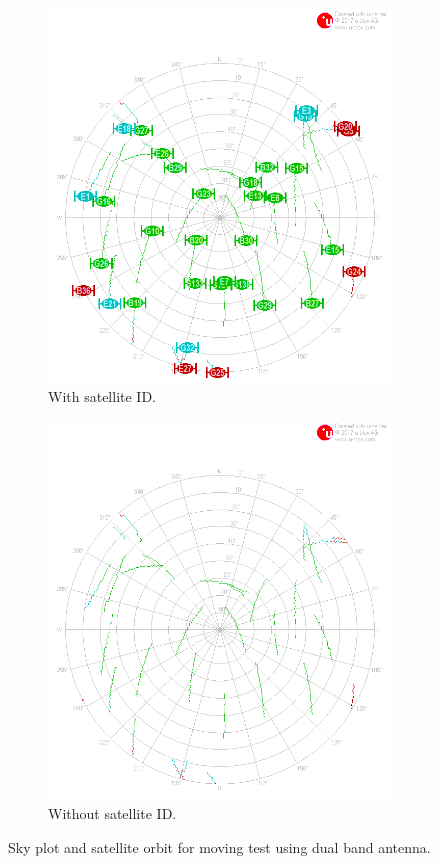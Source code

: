 \documentclass[letterpaper, 10 pt,onecolumn]{article}
\begin{document}
	\begin{figure}[H]
		\centering
		\begin{subfigure}{.5\textwidth}
			\includegraphics[width=0.9\linewidth]{../Moving_DualBand/skyplot.png}
			\caption{	
				With satellite ID.}
			\label{fig:mt2_sky}
		\end{subfigure}%
		\begin{subfigure}{.5\textwidth}
			\includegraphics[width=0.9\linewidth]{../Moving_DualBand/skyplot_orbit.png}
			\caption{	
				Without satellite ID.}
			\label{fig:mt2_obt}
		\end{subfigure}
		\caption[short]{Sky plot and satellite orbit for moving test using dual band antenna.}
		\label{fig:mt2}
	\end{figure}
	
\end{document}
